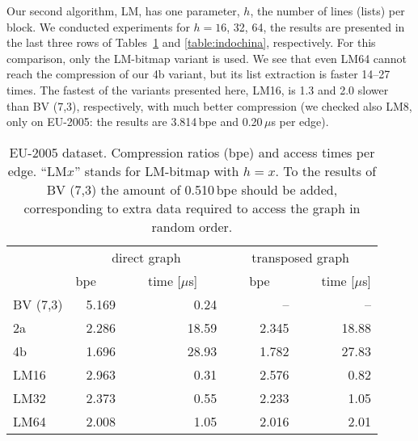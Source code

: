 \documentclass[envcountsame]{llncs}
\begin{document}
Our second algorithm, LM, has one parameter, $h$, the number of lines (lists) per block.
We conducted experiments for $h = 16$, 32, 64, the results are presented in the 
last three rows of Tables~\ref{table:eu} and \ref{table:indochina}, respectively.
For this comparison, only the LM-bitmap variant is used.
We see that even LM64 cannot reach the compression of our 4b variant, but its list 
extraction is faster 14--27 times. The fastest of the variants presented here, LM16, 
is 1.3 and 2.0 slower than BV (7,3), respectively, with much better compression 
(we checked also LM8, only on EU-2005: the results are 3.814\,bpe and 0.20\,$\mu$s 
per edge).


\begin{table}
\centering
\begin{tabular}{lrrrr}
\hline
        & \multicolumn{2}{c}{direct graph} & \multicolumn{2}{c}{transposed graph} \\
\cline{2-5}
        &  bpe~~~&~~~time [$\mu$s]~~~&~~~bpe~~~&~~~time [$\mu$s] \\
\hline
BV (7,3) & 5.169 & 0.24 & -- & -- \\
2a & 2.286 & 18.59 & 2.345 & 18.88 \\
4b & 1.696 & 28.93 & 1.782 & 27.83 \\
LM16 & 2.963 & 0.31 & 2.576 & 0.82 \\
LM32 & 2.373 & 0.55 & 2.233 & 1.05 \\
LM64 & 2.008 & 1.05 & 2.016 & 2.01 \\
\hline
\end{tabular}
\vspace{4mm}
\caption{EU-2005 dataset. Compression ratios (bpe) and access times per edge. 
``LM$x$'' stands for LM-bitmap with $h = x$.
To the results of BV (7,3) the amount of 0.510\,bpe should be added, corresponding 
to extra data required to access the graph in random order.}
\label{table:eu}
\end{table}
\end{document}
